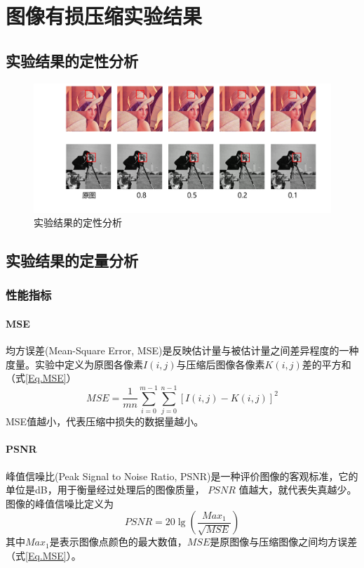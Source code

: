 \chapter{图像有损压缩实验结果}

\section{实验结果的定性分析}
\begin{figure}[htb]
    \centering
    \includegraphics[width=1.0\textwidth]{pages/evaluation/result-image.png}
    \caption{实验结果的定性分析}
    \label{Fig.result}
\end{figure}

\section{实验结果的定量分析}
\subsection{性能指标}

\subsubsection{MSE}
均方误差(Mean-Square Error, MSE)是反映估计量与被估计量之间差异程度的一种度量。实验中定义为原图各像素$I(i,j)$与压缩后图像各像素$K(i,j)$差的平方和（式\ref{Eq.MSE}）
\begin{equation}
    MSE=\frac{1}{mn} \sum_{i=0}^{m-1}\sum_{j=0}^{n-1} [I(i,j)-K(i,j)]^2
    \label{Eq.MSE}
\end{equation}
MSE值越小，代表压缩中损失的数据量越小。

\subsubsection{PSNR}
峰值信噪比(Peak Signal to Noise Ratio, PSNR)是一种评价图像的客观标准，它的单位是dB，用于衡量经过处理后的图像质量， $PSNR$ 值越大，就代表失真越少。图像的峰值信噪比定义为
\begin{equation}
    PSNR=20\lg (\frac{Max_1}{\sqrt{MSE}})
    \label{Eq.PSNR}
\end{equation}
其中$Max_1$是表示图像点颜色的最大数值，$MSE$是原图像与压缩图像之间均方误差（式\ref{Eq.MSE}）。


